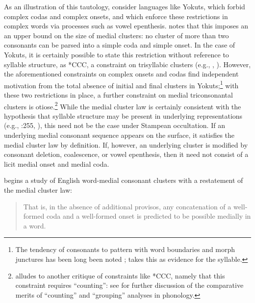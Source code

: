 As an illustration of this tautology, consider languages like Yokuts, which forbid complex codas and complex onsets, and which enforce these restrictions in complex words via processes such as vowel epenthesis.
\citet[26f.]{Newman1944} notes that this imposes an an upper bound on the size of medial clusters: no cluster of more than two consonants can be parsed into a simple coda and simple onset.
In the case of Yokuts, it is certainly possible to state this restriction without reference to syllable structure, as *CCC, a constraint on trisyllabic clusters (e.g., \citealt[92f.]{Ettlinger2008}, \citealt[820f.]{Zuraw2003a}).
However, the aforementioned constraints on complex onsets and codas find independent motivation from the total absence of initial and final clusters in Yokuts;\footnote{
    The tendency of consonants to pattern with word boundaries and morph junctures has been long been noted \citep[e.g.,][]{Hill1954,Lass1971,Moulton1947}; \citet[24f.]{Kahn1976} takes this as evidence for the syllable.}
with these two restrictions in place, a further constraint on medial triconsonantal clusters is otiose.\footnote{
    \citet[31f.]{Cote2000} alludes to another critique of constraints like *CCC, namely that this constraint requires ``counting'': see \citealt[64f.]{Isac2008} for further discussion of the comparative merits of ``counting'' and ``grouping'' analyses in phonology.}
While the medial cluster law is certainly consistent with the hypothesis that syllable structure may be present in underlying representations (e.g., \citealt{A74}:255, \citealt{Vaux2003}), this need not be the case under Stampean occultation.
If an underlying medial consonant sequence appears on the surface, it satisfies the medial cluster law by definition.
If, however, an underlying cluster is modified by consonant deletion, coalescence, or vowel epenthesis, then it need not consist of a licit medial onset and medial coda.

\citet{Pierrehumbert1994} begins a study of English word-medial consonant clusters with a restatement of the medial cluster law:

\begin{quote}
That is, in the absence of additional provisos, any concatenation of a well-formed coda and a well-formed onset is predicted to be possible medially in a word. \citep[168]{Pierrehumbert1994}
\end{quote}

